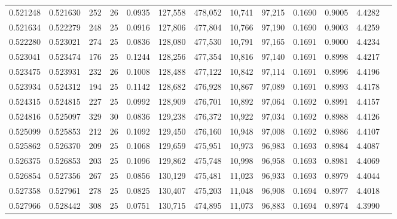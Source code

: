 \begin{tabular}{rrrrrrrrrrrrr}
0.521248 & 0.521630 &   252 &  26 &                                     0.0935 & 127,558 & 478,052 &  10,741 &  97,215 & 0.1690 & 0.9005 & 4.4282 \\
0.521634 & 0.522279 &   248 &  25 &                                     0.0916 & 127,806 & 477,804 &  10,766 &  97,190 & 0.1690 & 0.9003 & 4.4259 \\
0.522280 & 0.523021 &   274 &  25 &                                     0.0836 & 128,080 & 477,530 &  10,791 &  97,165 & 0.1691 & 0.9000 & 4.4234 \\
0.523041 & 0.523474 &   176 &  25 &                                     0.1244 & 128,256 & 477,354 &  10,816 &  97,140 & 0.1691 & 0.8998 & 4.4217 \\
0.523475 & 0.523931 &   232 &  26 &                                     0.1008 & 128,488 & 477,122 &  10,842 &  97,114 & 0.1691 & 0.8996 & 4.4196 \\
0.523934 & 0.524312 &   194 &  25 &                                     0.1142 & 128,682 & 476,928 &  10,867 &  97,089 & 0.1691 & 0.8993 & 4.4178 \\
0.524315 & 0.524815 &   227 &  25 &                                     0.0992 & 128,909 & 476,701 &  10,892 &  97,064 & 0.1692 & 0.8991 & 4.4157 \\
0.524816 & 0.525097 &   329 &  30 &                                     0.0836 & 129,238 & 476,372 &  10,922 &  97,034 & 0.1692 & 0.8988 & 4.4126 \\
0.525099 & 0.525853 &   212 &  26 &                                     0.1092 & 129,450 & 476,160 &  10,948 &  97,008 & 0.1692 & 0.8986 & 4.4107 \\
0.525862 & 0.526370 &   209 &  25 &                                     0.1068 & 129,659 & 475,951 &  10,973 &  96,983 & 0.1693 & 0.8984 & 4.4087 \\
0.526375 & 0.526853 &   203 &  25 &                                     0.1096 & 129,862 & 475,748 &  10,998 &  96,958 & 0.1693 & 0.8981 & 4.4069 \\
0.526854 & 0.527356 &   267 &  25 &                                     0.0856 & 130,129 & 475,481 &  11,023 &  96,933 & 0.1693 & 0.8979 & 4.4044 \\
0.527358 & 0.527961 &   278 &  25 &                                     0.0825 & 130,407 & 475,203 &  11,048 &  96,908 & 0.1694 & 0.8977 & 4.4018 \\
0.527966 & 0.528442 &   308 &  25 &                                     0.0751 & 130,715 & 474,895 &  11,073 &  96,883 & 0.1694 & 0.8974 & 4.3990 \\

\end{tabular}
